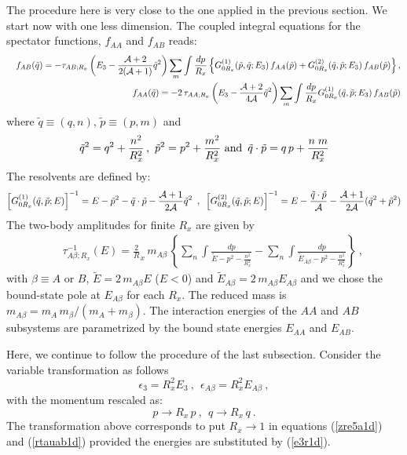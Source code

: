 \documentclass[twocolumn,showpacs,aps,prl,10pt]{revtex4}
\begin{document}
The procedure here is very close to the one applied in the previous section. We start now 
with one less dimension. The coupled integral equations for the spectator functions, $f_{AA}$ and 
$f_{AB}$ reads:
\begin{eqnarray}
\nonumber
&&f_{AB}(\tilde q) =-\tau_{AB;R_x}\left(E_3-\frac{{\cal A}+2}{2({\cal A}+1)}  \tilde q^2 \right) 
\sum_m\int \frac{dp}{R_x} \left\{G^{(1)}_{0R_x}(\tilde p,\tilde q;E_3)\, f_{AA}(\tilde p)
+ G^{(2)}_{0R_x}(\tilde q,\tilde p;E_3)\, f_{AB}(\tilde p)\right\},\\  
&&f_{AA}(\tilde q) =-2\,\tau_{AA;R_x}\left(E_3-\frac{{\cal A}+2}{4{\cal A}} \tilde q^2\right)
\sum_m\int \frac{dp}{R_x}G^{(1)}_{0R_x}(\tilde q,\tilde p;E_3)\, f_{AB}(\tilde p)
\label{zre5a1d}
\end{eqnarray}
where  $\tilde q\equiv (q,n)$, $\tilde p\equiv (p,m)$ and 
\begin{eqnarray}
\tilde q^2=q^2+{n^2\over R_x^2}\, ,\,\, \tilde p^2=p^2+{m^2\over R_x^2} \,\, {\rm and} \,\,\,
\tilde q\cdot \tilde p= q\,p +\frac{n\;m}{R_x^2}
\end{eqnarray}
The resolvents are defined by:
\begin{equation}
\left[G^{(1)}_{0R_x}(\tilde q,\tilde p;E)\right]^{-1}=
E-\tilde p^2-\tilde q\cdot \tilde p-\frac{{\cal A}+1}{2{\cal A}}\tilde q^2 
\,\,\, , \,\,\,
\left[G^{(2)}_{0R_x}(\tilde q,\tilde p;E)\right]^{-1}= E
-\frac{\tilde q\cdot \tilde p}{{\cal A}}-\frac{{\cal A}+1}{2{\cal A}}(\tilde q^2+\tilde p^2)
\label{greenq1d}\end{equation}
The two-body amplitudes for finite $R_x$ are given by
\begin{eqnarray}
\nonumber
&&\tau^{-1}_{A\beta;R_x}(E)
 =\frac2R_x\,m_{A\beta}\,\left\{\sum_n\int  
\frac{dp}{\tilde E-
p^2-\frac{n^2}{R_x^2}} 
-\sum_n\int  
\frac{dp}{\tilde E_{A\beta}-
p^2-\frac{n^2}{R_x^2}} \right\} 
\ , \label{rtauab1d}
\end{eqnarray}
with $\beta\equiv A$ or $ B$, $\tilde E=2\,m_{A\beta} E$ ($E<0$)
and $\tilde E_{A\beta}=2\,m_{A\beta} E_{A\beta}$ and we chose the bound-state pole at $E_{A\beta}$ 
for each $R_x$. The reduced mass is $m_{A\beta}=m_A\, m_\beta/(m_A+ m_\beta)$.
The interaction energies of the $AA$ and $AB$ subsystems are parametrized by the bound state 
energies $E_{AA}$ and $E_{AB}$.

Here, we continue to follow the procedure of the last subsection. Consider the variable 
transformation as follows
\begin{equation}
\epsilon_3=R_x^2E_3~,~~\epsilon_{A\beta}=R_x^2E_{A\beta}~, \label{e3r1d}
\end{equation}
with the momentum rescaled as:
\begin{equation}
p\to R_x\, p~,~~q\to R_x\, q~. \label{qpr1d}
\end{equation}
The transformation above corresponds to put  $R_x\to1$ in equations (\ref{zre5a1d}) 
and (\ref{rtauab1d}) provided the energies are substituted by (\ref{e3r1d}).
\end{document}
